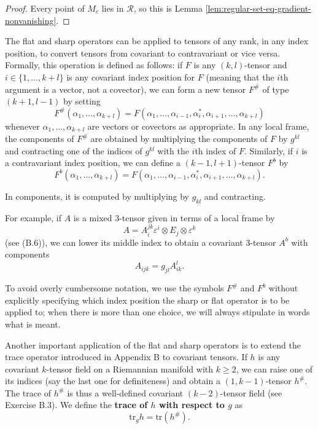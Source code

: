 \begin{proof}
\leanok
{}
Every point of $M_c$ lies in $\mathcal{R}$, so this is Lemma \ref{lem:regular-set-eq-gradient-nonvanishing}.
\end{proof}

The flat and sharp operators can be applied to tensors of any rank, in any index
position, to convert tensors from covariant to contravariant or vice versa. Formally,
this operation is defined as follows: if $F$ is any $(k,l)$-tensor and $i \in \{1, \ldots, k + l\}$ is
any covariant index position for $F$ (meaning that the $i$th argument is a vector, not a
covector), we can form a new tensor $F^\#$ of type $(k + 1, l - 1)$ by setting
\[
F^\#(\alpha_1, \ldots, \alpha_{k+l}) = F(\alpha_1, \ldots, \alpha_{i-1}, \alpha_i^*, \alpha_{i+1}, \ldots, \alpha_{k+l})
\]
whenever $\alpha_1, \ldots, \alpha_{k+l}$ are vectors or covectors as appropriate. In any local frame,
the components of $F^\#$ are obtained by multiplying the components of $F$ by $g^{kl}$ and
contracting one of the indices of $g^{kl}$ with the $i$th index of $F$. Similarly, if $i$ is a
contravariant index position, we can define a $(k - 1, l + 1)$-tensor $F^b$ by
\[
F^b(\alpha_1, \ldots, \alpha_{k+l}) = F(\alpha_1, \ldots, \alpha_{i-1}, \alpha_i^*, \alpha_{i+1}, \ldots, \alpha_{k+l}).
\]

In components, it is computed by multiplying by $g_{kl}$ and contracting.

For example, if $A$ is a mixed 3-tensor given in terms of a local frame by
\[
A = A_i^{jk} \varepsilon^i \otimes E_j \otimes \varepsilon^k
\]
(see (B.6)), we can lower its middle index to obtain a covariant 3-tensor $A^b$ with components
\[
A_{ijk} = g_{jl} A^l_{ik}.
\]

To avoid overly cumbersome notation, we use the symbols $F^\#$ and $F^b$ without explicitly specifying which index position the sharp or flat operator is to be applied to; when there is more than one choice, we will always stipulate in words what is meant.

Another important application of the flat and sharp operators is to extend the trace operator introduced in Appendix B to covariant tensors. If $h$ is any covariant $k$-tensor field on a Riemannian manifold with $k \ge 2$, we can raise one of its indices (say the last one for definiteness) and obtain a $(1, k-1)$-tensor $h^\#$. The trace of $h^\#$ is thus a well-defined covariant $(k-2)$-tensor field (see Exercise B.3). We define the \textbf{trace of $h$ with respect to $g$} as
\[
\text{tr}_g h = \text{tr}(h^\#).
\]

